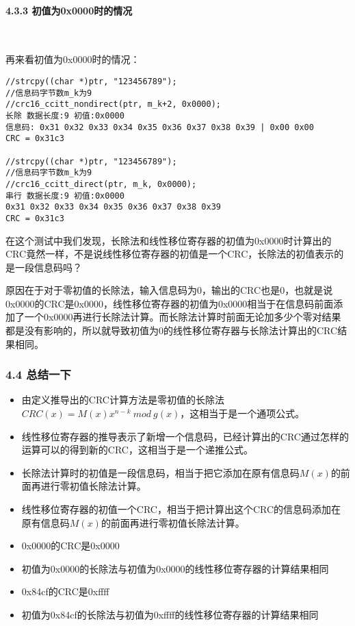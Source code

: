 \documentclass[
]{article}
\begin{document}
\paragraph{4.3.3 初值为0x0000时的情况}~{}


再来看初值为0x0000时的情况：

\begin{verbatim}
//strcpy((char *)ptr, "123456789");
//信息码字节数m_k为9
//crc16_ccitt_nondirect(ptr, m_k+2, 0x0000);
长除 数据长度:9 初值:0x0000
信息码: 0x31 0x32 0x33 0x34 0x35 0x36 0x37 0x38 0x39 | 0x00 0x00
CRC = 0x31c3

//strcpy((char *)ptr, "123456789");
//信息码字节数m_k为9
//crc16_ccitt_direct(ptr, m_k, 0x0000);
串行 数据长度:9 初值:0x0000
0x31 0x32 0x33 0x34 0x35 0x36 0x37 0x38 0x39
CRC = 0x31c3
\end{verbatim}

在这个测试中我们发现，长除法和线性移位寄存器的初值为0x0000时计算出的CRC竟然一样，不是说线性移位寄存器的初值是一个CRC，长除法的初值表示的是一段信息码吗？

原因在于对于零初值的长除法，输入信息码为0，输出的CRC也是0，也就是说0x0000的CRC是0x0000，线性移位寄存器的初值为0x0000相当于在信息码前面添加了一个0x0000再进行长除法计算。而长除法计算时前面无论加多少个零对结果都是没有影响的，所以就导致初值为0的线性移位寄存器与长除法计算出的CRC结果相同。

\hypertarget{header-n247}{%
\subsubsection{4.4 总结一下}\label{header-n247}}

\begin{itemize}
\item
  由定义推导出的CRC计算方法是零初值的长除法$CRC(x)=M(x)x^{n-k} \: mod \: g(x)$，这相当于是一个通项公式。
\item
  线性移位寄存器的推导表示了新增一个信息码，已经计算出的CRC通过怎样的运算可以的得到新的CRC，这相当于是一个递推公式。
\item
  长除法计算时的初值是一段信息码，相当于把它添加在原有信息码$M(x)$的前面再进行零初值长除法计算。
\item
  线性移位寄存器的初值一个CRC，相当于把计算出这个CRC的信息码添加在原有信息码$M(x)$的前面再进行零初值长除法计算。
\item
  0x0000的CRC是0x0000
\item
  初值为0x0000的长除法与初值为0x0000的线性移位寄存器的计算结果相同
\item
  0x84cf的CRC是0xffff
\item
  初值为0x84cf的长除法与初值为0xffff的线性移位寄存器的计算结果相同
\end{itemize}
\end{document}
